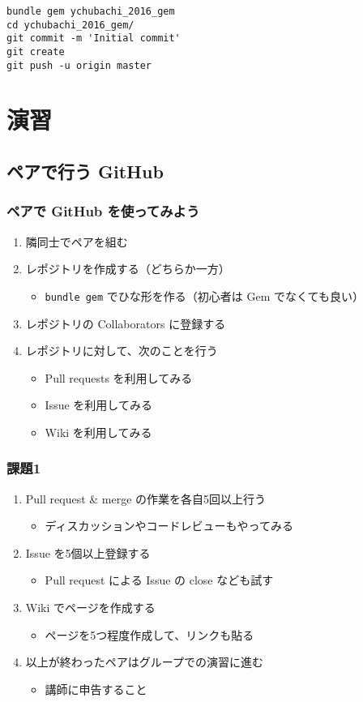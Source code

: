 \documentclass{bxjsarticle}
\begin{document}
\begin{verbatim}
bundle gem ychubachi_2016_gem
cd ychubachi_2016_gem/
git commit -m 'Initial commit'
git create
git push -u origin master
\end{verbatim}

\section{演習}
\label{sec-4}
\subsection{ペアで行う GitHub}
\label{sec-4-1}
\subsubsection{ペアで GitHub を使ってみよう}
\label{sec-4-1-1}
\begin{enumerate}
\item 隣同士でペアを組む
\item レポジトリを作成する（どちらか一方）
\begin{itemize}
\item \texttt{bundle gem} でひな形を作る（初心者は Gem でなくても良い）
\end{itemize}
\item レポジトリの Collaborators に登録する
\item レポジトリに対して、次のことを行う
\begin{itemize}
\item Pull requests を利用してみる
\item Issue を利用してみる
\item Wiki を利用してみる
\end{itemize}
\end{enumerate}
\subsubsection{課題1}
\label{sec-4-1-2}
\begin{enumerate}
\item Pull request \& merge の作業を各自5回以上行う
\begin{itemize}
\item ディスカッションやコードレビューもやってみる
\end{itemize}
\item Issue を5個以上登録する
\begin{itemize}
\item Pull request による Issue の close なども試す
\end{itemize}
\item Wiki でページを作成する
\begin{itemize}
\item ページを5つ程度作成して、リンクも貼る
\end{itemize}
\item 以上が終わったペアはグループでの演習に進む
\begin{itemize}
\item 講師に申告すること
\end{itemize}
\end{enumerate}
\end{document}
